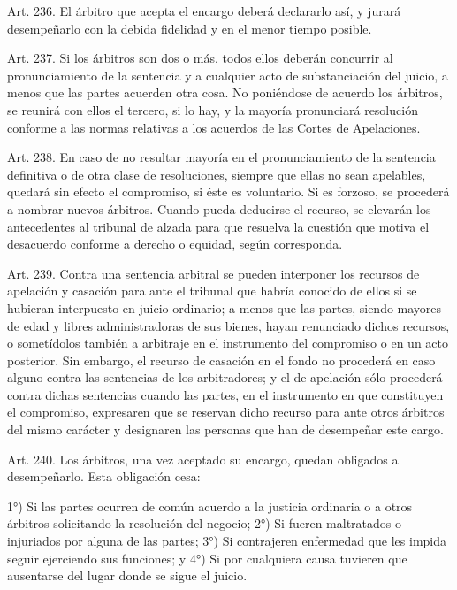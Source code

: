     Art. 236. El árbitro que acepta el encargo deberá declararlo así, y jurará desempeñarlo con la debida fidelidad y en el menor tiempo posible.

    Art. 237. Si los árbitros son dos o más, todos ellos deberán concurrir al pronunciamiento de la sentencia y a cualquier acto de substanciación del juicio, a menos que las partes acuerden otra cosa.
    No poniéndose de acuerdo los árbitros, se reunirá con ellos el tercero, si lo hay, y la mayoría pronunciará resolución conforme a las normas relativas a los acuerdos de las Cortes de Apelaciones.



    Art. 238. En caso de no resultar mayoría en el pronunciamiento de la sentencia definitiva o de otra clase de resoluciones, siempre que ellas no sean apelables, quedará sin efecto el compromiso, si éste es voluntario. Si es forzoso, se procederá a nombrar nuevos árbitros.
    Cuando pueda deducirse el recurso, se elevarán los antecedentes al tribunal de alzada para que resuelva la cuestión que motiva el desacuerdo conforme a derecho o equidad, según corresponda.


    Art. 239. Contra una sentencia arbitral se pueden interponer los recursos de apelación y casación para ante el tribunal que habría conocido de ellos si se hubieran interpuesto en juicio ordinario; a menos que las partes, siendo mayores de edad y libres administradoras de sus bienes, hayan renunciado dichos recursos, o sometídolos también a arbitraje en el instrumento del compromiso o en un acto posterior.
    Sin embargo, el recurso de casación en el fondo no procederá en caso alguno contra las sentencias de los arbitradores; y el de apelación sólo procederá contra dichas sentencias cuando las partes, en el instrumento en que constituyen el compromiso, expresaren que se reservan dicho recurso para ante otros árbitros del mismo carácter y designaren las personas que han de desempeñar este cargo.

    Art. 240. Los árbitros, una vez aceptado su encargo, quedan obligados a desempeñarlo.
    Esta obligación cesa:

    1°) Si las partes ocurren de común acuerdo a la justicia ordinaria o a otros árbitros solicitando la resolución del negocio;
    2°) Si fueren maltratados o injuriados por alguna de las partes;
    3°) Si contrajeren enfermedad que les impida seguir ejerciendo sus funciones; y
    4°) Si por cualquiera causa tuvieren que ausentarse del lugar donde se sigue el juicio.


